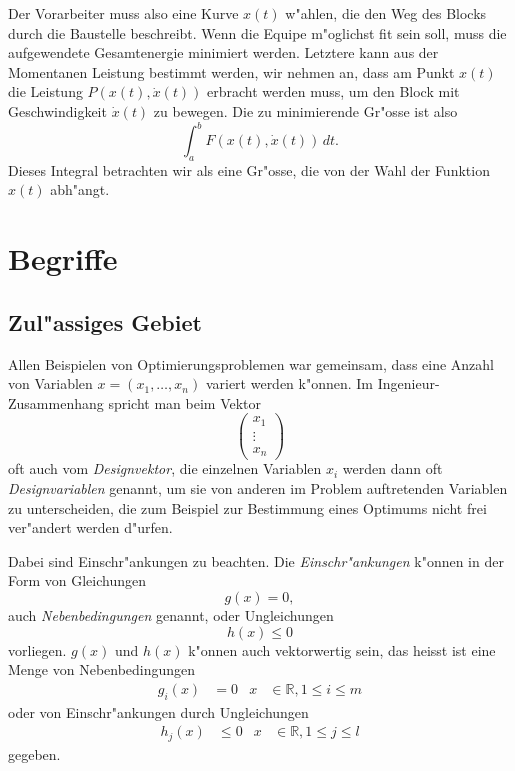 Der Vorarbeiter muss also eine
Kurve $x(t)$ w"ahlen, die den Weg des Blocks durch die Baustelle
beschreibt.
Wenn die Equipe m"oglichst fit sein soll, muss die aufgewendete
Gesamtenergie minimiert werden. 
Letztere kann aus der Momentanen Leistung bestimmt werden, wir 
nehmen an, dass am Punkt $x(t)$ die Leistung $P(x(t), \dot x(t))$
erbracht werden muss, um den Block mit Geschwindigkeit $\dot x(t)$
zu bewegen. Die zu minimierende Gr"osse ist also
\[
\int_a^bF(x(t), \dot x(t))\,dt.
\]
Dieses Integral betrachten wir als eine Gr"osse, die von der Wahl
der Funktion $x(t)$ abh"angt.

\section{Begriffe\label{section-begriffe}}
\subsection{Zul"assiges Gebiet}
Allen Beispielen von Optimierungsproblemen war gemeinsam, dass eine
Anzahl von Variablen $x=(x_1,\dots,x_n)$ variert werden k"onnen.
Im Ingenieur-Zusammenhang spricht man beim Vektor 
\[
\begin{pmatrix}
x_1\\\vdots\\x_n
\end{pmatrix}
\]
oft auch vom {\em Designvektor}, die einzelnen Variablen $x_i$ werden
dann oft {\em Designvariablen} genannt, um sie von anderen im Problem
auftretenden Variablen zu unterscheiden, die zum Beispiel zur Bestimmung
eines Optimums nicht frei ver"andert werden d"urfen.

Dabei sind Einschr"ankungen zu beachten.
Die {\em Einschr"ankungen} k"onnen in der Form von Gleichungen
\begin{equation}
g(x)=0,
\label{begriff-nebenbedingungen}
\end{equation}
auch {\em Nebenbedingungen} genannt, oder Ungleichungen
\begin{equation}
h(x)\le 0
\label{begriff-einschraenkungen}
\end{equation}
vorliegen.
$g(x)$ und $h(x)$ k"onnen auch vektorwertig sein,
das heisst ist eine Menge von Nebenbedingungen
\begin{align*}
g_i(x)&=0&x&\in\mathbb R, 1\le i\le m
\end{align*}
oder von Einschr"ankungen durch Ungleichungen
\begin{align*}
h_j(x)&\le 0&x&\in\mathbb R, 1\le j\le l
\end{align*}
gegeben.

